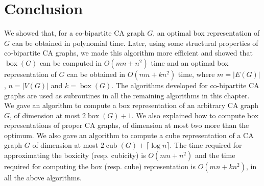 \section{Conclusion}
We showed that, for a co-bipartite CA graph $G$, an optimal box representation of $G$ can be obtained in polynomial time. 
Later, using some structural properties of co-bipartite CA graphs, we made this algorithm more efficient and showed that $\operatorname{box}(G)$ can be computed in $O(mn+n^2)$ time and an optimal box representation of $G$ can be obtained in $O(mn+kn^2)$ time, where $m=|E(G)|$, $n=|V(G)|$ and $k=\operatorname{box}(G)$. 
The algorithms developed for co-bipartite CA graphs are used as subroutines in all the remaining algorithms in this chapter. We gave an algorithm to compute a box representation of an arbitrary CA graph $G$, of dimension at most $2 \operatorname{box}(G)+1$. 
We also explained how to compute box representations of proper CA graphs, of dimension at most two more than the optimum. 
We also gave an algorithm to compute a cube representation of a CA graph $G$ of dimension at most $2 \operatorname{cub}(G)+\lceil \log{n} \rceil$. 
The time required for approximating the boxicity (resp. 
cubicity) is $O(mn+n^2)$ and the time required for computing 
the box (resp. cube) representation is $O(mn+kn^2)$, in all the above algorithms.  

